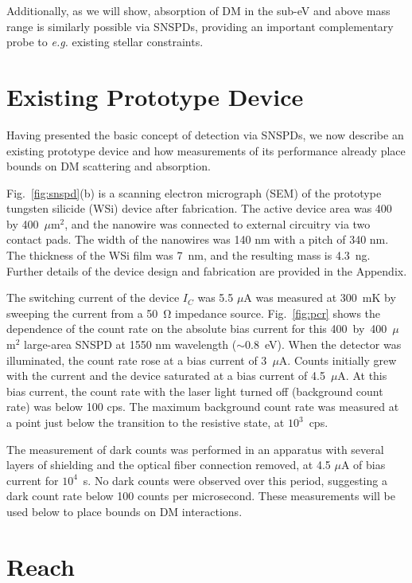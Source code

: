 \documentclass[twocolumn,10pt,prl,nofootinbib,preprintnumbers]{revtex4-1}
\begin{document}
Additionally, as we will show, absorption of DM in the sub-eV and
above mass range is similarly possible via SNSPDs, providing an
important complementary probe to {\it e.g.} existing stellar
constraints.



\section{Existing Prototype Device}
%

Having presented the basic concept of detection via SNSPDs, we now
describe an existing prototype device and how measurements of its
performance already place bounds on DM scattering and absorption.



Fig.~\ref{fig:snspd}(b) is a scanning electron micrograph (SEM) of the prototype
tungsten silicide (WSi) device after fabrication. The active device
area was 400 by 400~$\mu$m$^{2}$, and the nanowire was connected to
external circuitry via two contact pads. The width of the nanowires
was 140 nm with a pitch of 340 nm. The thickness of the WSi film was 7~nm, and the resulting mass is 4.3~ng. Further details of the device design and fabrication
are provided in the Appendix.

The switching current of the device $I_C$ was 5.5 $\mu$A
was measured at 300~mK by sweeping the current from a \SI{50}{\ohm}
impedance source. Fig.~\ref{fig:pcr} shows the dependence of the count
rate on the absolute bias current for this 400~by~400~$\mu$m$^2$
large-area SNSPD at 1550 nm wavelength ($\sim$0.8~eV). When the detector was
illuminated, the count rate rose at a bias  
current of 3~$\mu$A. Counts initially grew with the current and the device saturated at a bias current of 4.5~$\mu$A. At this bias current, the count rate with the laser light turned off (background count rate) was below 100 cps. The maximum background count rate was
measured at a point just below the transition to the resistive state,
at $10^3$~cps.  

The measurement of dark counts
was performed in an apparatus with several layers of shielding and the optical fiber connection removed, 
at 4.5 $\mu$A of bias current for $10^4$~s. No dark counts were observed over this period, suggesting a dark count
rate below 100 counts per microsecond. These measurements will be used
below to place bounds on DM interactions.

\section{Reach}
\end{document}
